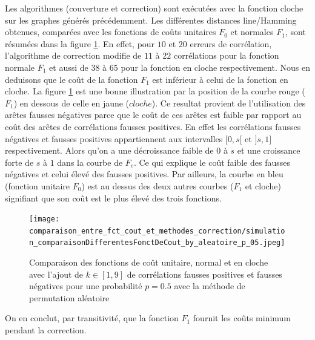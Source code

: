 \documentclass[onecolumn, 12pt]{book}
\begin{document}
Les algorithmes (couverture et correction) sont ex\'ecut\'ees avec la fonction cloche sur les graphes g\'en\'er\'es pr\'ec\'edemment. 
Les diff\'erentes distances line/Hamming obtenues, compar\'ees avec les fonctions de co\^uts unitaires $F_0$ et normales $F_1$, sont r\'esum\'ees dans la figure \ref{comparaison_fct_cloche_unitaire_normal_p05}.
En effet, pour $10$ et $20$ erreurs de corr\'elation, l'algorithme de correction modifie  de $11$ \`a $22$ corr\'elations pour la fonction normale $F_1$ et aussi de $38$ \`a $65$ pour la fonction en cloche respectivement. 
Nous en deduisons que le co\^ut de la fonction $F_1$ est  inf\'erieur \`a celui de la fonction en cloche. 
La figure \ref{comparaison_fct_cloche_unitaire_normal_p05}  est une bonne illustration par la position de la courbe rouge ($F_1$) en dessous de celle en jaune ($cloche$).
\newline
Ce resultat provient de l'utilisation des ar\^etes fausses n\'egatives parce que le co\^ut de ces ar\^etes est faible par rapport au co\^ut des ar\^etes de corr\'elations fausses positives.
En effet les corr\'elations fausses n\'egatives et fausses positives appartiennent aux intervalles $[0,s[$ et $]s,1]$ respectivement. 
Alors qu'on a une d\'ecroissance faible de $0$ \`a $s$ et une croissance forte de $s$ \`a $1$ dans la courbe de $F_c$. 
Ce qui explique le co\^ut faible des fausses n\'egatives et celui \'elev\'e des fausses positives. 
Par ailleurs, la courbe en bleu (fonction unitaire $F_0$) est au dessus des deux autres courbes ($F_1$ et cloche) signifiant que son co\^ut est le plus \'elev\'e des trois fonctions.
\newline
\begin{centering} 
\begin{figure}[htb!] 
\texttt{[image: comparaison\_entre\_fct\_cout\_et\_methodes\_correction/simulation\_comparaisonDifferentesFonctDeCout\_by\_aleatoire\_p\_05.jpeg]}
\caption{ Comparaison des fonctions de co\^ut unitaire, normal et en cloche avec l'ajout de $k \in [1,9]$ de corr\'elations fausses positives et fausses n\'egatives pour une probabilit\'e $p = 0.5$ avec la m\'ethode de permutation al\'eatoire }
\label{comparaison_fct_cloche_unitaire_normal_p05} 
\end{figure}
\end{centering} 
On en conclut, par transitivit\'e, que la fonction $F_1$ fournit les co\^uts minimum pendant la correction.
\end{document}
